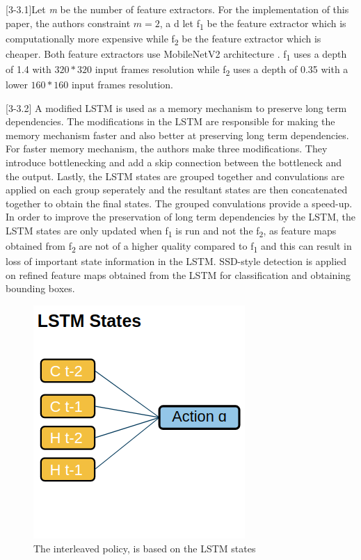 \documentclass[conference]{IEEEtran}
\begin{document}
[3-3.1]Let \textit{m} be the number of feature extractors. For the implementation of this paper, the authors constraint $\textit{m}=2$, a d let f\textsubscript{1} be the feature extractor which is computationally more expensive while f\textsubscript{2} be the feature extractor which is cheaper. Both feature extractors use MobileNetV2 architecture \cite{b36}. f\textsubscript{1} uses a depth of 1.4 with $320*320$ input frames resolution while f\textsubscript{2} uses a depth of 0.35 with a lower $160*160$ input frames resolution. \newline

[3-3.2] A modified LSTM \cite{b18} is used as a memory mechanism to preserve long term dependencies. The modifications in the LSTM are responsible for making the memory mechanism faster and also better at preserving long term dependencies. For faster memory mechanism, the authors make three modifications. They introduce bottlenecking and add a skip connection between the bottleneck and the output. Lastly, the LSTM states are grouped together and convulations are applied on each group seperately and the resultant states are then concatenated together to obtain the final states. The grouped convulations provide a speed-up. In order to improve the preservation of long term dependencies by the LSTM, the LSTM states are only updated when f\textsubscript{1} is run and not the f\textsubscript{2}, as feature maps obtained from f\textsubscript{2} are not of a higher quality compared to f\textsubscript{1} and this can result in loss of important state information in the LSTM. \newline
SSD-style \cite{b17} detection is applied on refined feature maps obtained from the LSTM for classification and obtaining bounding boxes. \newline

\begin{figure}[h]
\centering
\includegraphics[width=0.33\columnwidth]{interleaved-policy}
\caption{The interleaved policy, is based on the LSTM states}
\end{figure}
\end{document}
